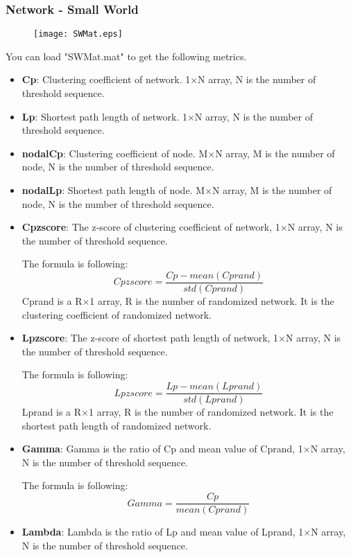 \documentclass[11pt]{article}
\begin{document}
			\subsubsection{Network - Small World}
				\begin{figure}
					\begin{center}
						\texttt{[image: SWMat.eps]}
					\end{center}
				\end{figure}
				You can load "SWMat.mat" to get the following metrics.
				\begin{itemize}
					\item \textbf{Cp}: Clustering coefficient of network.
						1$\times$N array, N is the number of threshold sequence.
					\item \textbf{Lp}: Shortest path length of network.
						1$\times$N array, N is the number of threshold sequence.
					\item \textbf{nodalCp}: Clustering coefficient of node.
						M$\times$N array, M is the number of node, N is the number of threshold sequence.
					\item \textbf{nodalLp}: Shortest path length of node.
						M$\times$N array, M is the number of node, N is the number of threshold sequence.
					\item \textbf{Cpzscore}: The z-score of clustering coefficient of network, 
						1$\times$N array, N is the number of threshold sequence.

						The formula is following:
						$$Cpzscore=\frac{Cp-mean(Cprand)}{std(Cprand)}$$
						Cprand is a R$\times$1 array, R is the number of randomized network. 
						It is the clustering coefficient of randomized network.
					\item \textbf{Lpzscore}: The z-score of shortest path length of network,
						1$\times$N array, N is the number of threshold sequence.

						The formula is following:
						$$Lpzscore=\frac{Lp-mean(Lprand)}{std(Lprand)}$$
						Lprand is a R$\times$1 array, R is the number of randomized network. 
						It is the shortest path length of randomized network.
					\item \textbf{Gamma}: Gamma is the ratio of Cp and mean value of Cprand,
						1$\times$N array, N is the number of threshold sequence.
					
						The formula is following:
						$$Gamma=\frac{Cp}{mean(Cprand)}$$
					\item \textbf{Lambda}: Lambda is the ratio of Lp and mean value of Lprand,
						1$\times$N array, N is the number of threshold sequence.
						

\end{itemize}
\end{document}
